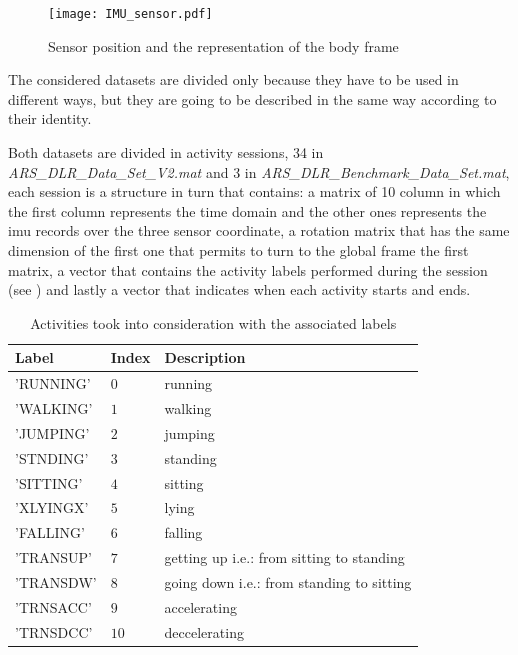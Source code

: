 \begin{figure}[htp]
\texttt{[image: IMU\_sensor.pdf]}
\caption{Sensor position and the representation of the body frame}
\label{fig:IMU}
\end{figure}

The considered datasets are divided only because they have to be used in different ways, but they are going to be described in the same way according to their identity.

Both datasets are divided in activity sessions, 34 in \textit{ARS\_DLR\_Data\_Set\_V2.mat} and 3 in \textit{ARS\_DLR\_Benchmark\_Data\_Set.mat}, each session is a structure in turn  that contains: a matrix of 10 column in which the first column represents the time domain and the other ones represents the \gls{imu} records over the three sensor coordinate, a rotation matrix that has the same dimension of the first one that permits to turn to the global frame the first matrix, a vector that contains the activity labels performed during the session (see ) and lastly a vector that indicates when each activity starts and ends.

\begin{table}[htp]
\small
	\centering
		\renewcommand{\arraystretch}{1}%
	\begin{tabular}{@{}lll@{}}
	\toprule
	Label & Index & Description\\ \midrule
	'RUNNING' & $0$ & running \\
	'WALKING' & $1$ & walking \\
	'JUMPING' & $2$ & jumping  \\
	'STNDING' & $3$ & standing \\
	'SITTING' & $4$ & sitting\\
	'XLYINGX' & $5$ & lying \\
	'FALLING' & $6$ & falling \\
	'TRANSUP' & $7$ & getting up i.e.: from sitting to standing \\
	'TRANSDW' & $8$ & going down i.e.: from standing to sitting\\
	'TRNSACC' & $9$ & accelerating\\
	'TRNSDCC' & $10$ & deccelerating\\
	\bottomrule
	\end{tabular}
	\caption{Activities took into consideration with the associated labels}
	\label{tab:label}
\end{table}


